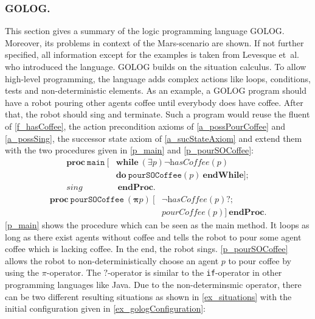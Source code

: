 \subsubsection{GOLOG.}\label{fun:apl_golog}
This section gives a summary of the logic programming language GOLOG. Moreover, its problems in context of the Mars-scenario are shown. If not further specified, all information except for the examples is taken from Levesque et~al.~\cite{levesque_golog:_1997} who introduced the language. GOLOG builds on the situation calculus. To allow high-level programming, the language adds complex actions like loops, conditions, tests and non-deterministic elements. As an example, a GOLOG program should have a robot pouring other agents coffee until everybody does have coffee. After that, the robot should sing and terminate. Such a program would reuse the fluent of \autoref{f_hasCoffee}, the action precondition axioms of \autoref{a_possPourCoffee} and \ref{a_possSing}, the successor state axiom of \autoref{a_sucStateAxiom} and extend them with the two procedures given in \autoref{p_main} and \ref{p_pourSOCoffee}:
\begin{equation}\label{p_main}
  \begin{split}
    \textbf{proc}\ \texttt{main}\ [&\textbf{while}\ (\exists p) \neg\textit{hasCoffee}(p) \\
    &\textbf{do}\ \texttt{pourSOCoffee}(p)\ \textbf{endWhile}]; \\
    \textit{sing}&\ \textbf{endProc}.
  \end{split}
\end{equation}
\begin{equation}\label{p_pourSOCoffee}
  \begin{split}
    \textbf{proc}\ \texttt{pourSOCoffee}\ (\boldsymbol{\pi} p)\ [ &\neg\textit{hasCoffee}(p)\textbf{?}; \\
    &\textit{pourCoffee}(p)]\ \textbf{endProc}.
  \end{split}
\end{equation}
\autoref{p_main} shows the procedure which can be seen as the main method. It loops as long as there exist agents without coffee and tells the robot to pour some agent coffee which is lacking coffee. In the end, the robot sings. \autoref{p_pourSOCoffee} allows the robot to non-deterministically choose an agent $p$ to pour coffee by using the $\pi$-operator. The $?$-operator is similar to the \texttt{if}-operator in other programming languages like Java. Due to the non-determinsmic operator, there can be two different resulting situations as shown in \autoref{ex_situations} with the initial configuration given in \autoref{ex_gologConfiguration}:
